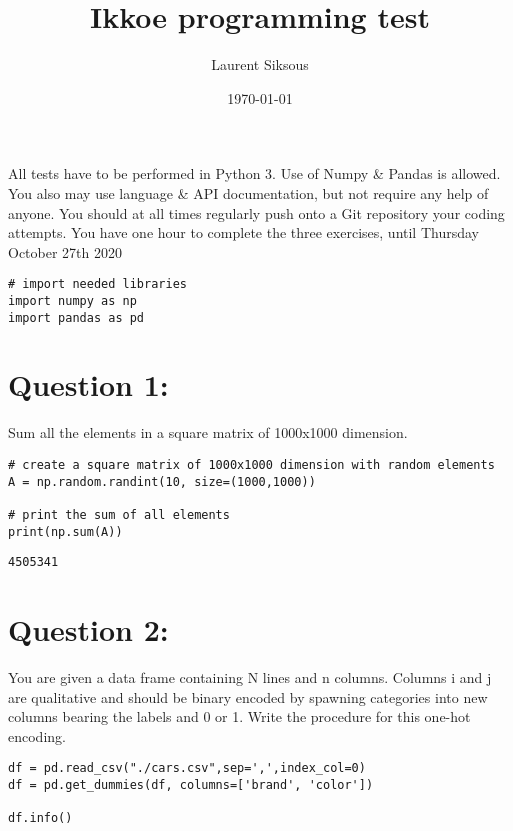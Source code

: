 \documentclass[11pt]{article}
\author{Laurent Siksous}
\date{\today}
\title{Ikkoe programming test}
\begin{document}
\maketitle
All tests have to be performed in Python 3. Use of Numpy \& Pandas is allowed. You also may use 
language \& API documentation, but not require any help of anyone.
You should at all times regularly push onto a Git repository your coding attempts.
You have one hour to complete the three exercises, until Thursday October 27th 2020

\begin{verbatim}
# import needed libraries
import numpy as np
import pandas as pd 
\end{verbatim}

\section{Question 1:}
\label{sec:orgdc6b209}
Sum all the elements in a square matrix of 1000x1000 dimension.

\begin{verbatim}
# create a square matrix of 1000x1000 dimension with random elements
A = np.random.randint(10, size=(1000,1000))

# print the sum of all elements
print(np.sum(A))
\end{verbatim}

\begin{verbatim}
4505341
\end{verbatim}

\section{Question 2:}
\label{sec:org72c89fa}
You are given a data frame containing N lines and n columns. Columns i and j are qualitative and 
should be binary encoded by spawning categories into new columns bearing the labels and 0 or 1. 
Write the procedure for this one-hot encoding.

\begin{verbatim}
df = pd.read_csv("./cars.csv",sep=',',index_col=0)
df = pd.get_dummies(df, columns=['brand', 'color'])

df.info()
\end{verbatim}
\end{document}
